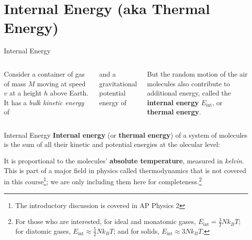 \documentclass[12pt,compress,aspectratio=169]{beamer}
\begin{document}
\section{Internal Energy (aka Thermal Energy)}

\begin{frame}{Internal Energy}
  \begin{columns}

    Consider a container of gas of mass $M$ moving at speed $v$ at a height $h$
    above Earth. It has a \emph{bulk kinetic energy} of

    
    and a gravitational potential energy of


    \vspace{-.1in}But the random motion of the air molecules also contribute to
    additional energy, called the \textbf{internal energy} $E_\text{int}$, or
    \textbf{thermal energy}.
  \end{columns}
\end{frame}



\begin{frame}{Internal Energy}
  \textbf{Internal energy} (or \textbf{thermal energy}) of a system of
  molecules is the sum of all their kinetic and potential energies at the
  olecular level:
  

  It is proportional to the molecules' \textbf{absolute temperature}, measured
  in \emph{kelvin}. This is part of a major field in physics called
  thermodynamics that is not covered in this course\footnote{The introductory
  discussion is covered in AP Physics 2}; we are only including them here for
  completeness.\footnote{For those who are interested, for ideal and monatomic
  gases, $E_\text{int}=\frac32Nk_BT$; for diatomic gases,
  $E_\text{int}\approx\frac52Nk_BT$; and for solids, $E_\text{int}\approx3Nk_BT$.}
\end{frame}
\end{document}
